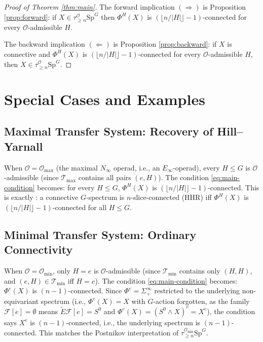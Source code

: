 \documentclass[12pt]{article}
\theoremstyle{definition}
\newcommand{\calO}{\mathcal{O}}
\newcommand{\SpG}{\mathrm{Sp}^G}
\newcommand{\floor}[1]{\lfloor #1 \rfloor}
\begin{document}
\begin{proof}[Proof of Theorem \textup{\ref{thm:main}}]
The forward implication $(\Rightarrow)$ is Proposition \ref{prop:forward}: if
$X \in \tau_{\geq n}^{\calO}\SpG$ then $\Phi^H(X)$ is $(\floor{n/|H|}-1)$-connected for
every $\calO$-admissible $H$.

The backward implication $(\Leftarrow)$ is Proposition \ref{prop:backward}: if $X$ is
connective and $\Phi^H(X)$ is $(\floor{n/|H|}-1)$-connected for every $\calO$-admissible
$H$, then $X \in \tau_{\geq n}^{\calO}\SpG$.
\end{proof}

\section{Special Cases and Examples}

\subsection{Maximal Transfer System: Recovery of Hill--Yarnall}

When $\calO = \calO_{\max}$ (the maximal $N_\infty$ operad, i.e., an $E_\infty$-operad),
every $H \leq G$ is $\calO$-admissible (since $\mathcal{T}_{\max}$ contains all pairs
$(e, H)$). The condition \eqref{eq:main-condition} becomes: for every $H \leq G$, $\Phi^H(X)$
is $(\floor{n/|H|}-1)$-connected. This is exactly \cite[Theorem 1.1]{HillYarnall2017}: a
connective $G$-spectrum is $n$-slice-connected (HHR) iff $\Phi^H(X)$ is
$(\floor{n/|H|}-1)$-connected for all $H \leq G$.

\subsection{Minimal Transfer System: Ordinary Connectivity}

When $\calO = \calO_{\min}$, only $H = e$ is $\calO$-admissible (since $\mathcal{T}_{\min}$
contains only $(H,H)$, and $(e, H) \in \mathcal{T}_{\min}$ iff $H = e$). The condition
\eqref{eq:main-condition} becomes: $\Phi^e(X)$ is $(n-1)$-connected. Since $\Phi^e = \Sigma^\infty_+$
restricted to the underlying non-equivariant spectrum (i.e., $\Phi^e(X) = X$ with $G$-action
forgotten, as the family $\mathcal{F}[e] = \emptyset$ means $\widetilde{E}\mathcal{F}[e] = S^0$
and $\Phi^e(X) = (S^0 \wedge X)^e = X^e$), the condition says $X^e$ is $(n-1)$-connected,
i.e., the underlying spectrum is $(n-1)$-connected. This matches the Postnikov interpretation of
$\tau_{\geq n}^{\calO_{\min}}\SpG$.
\end{document}
